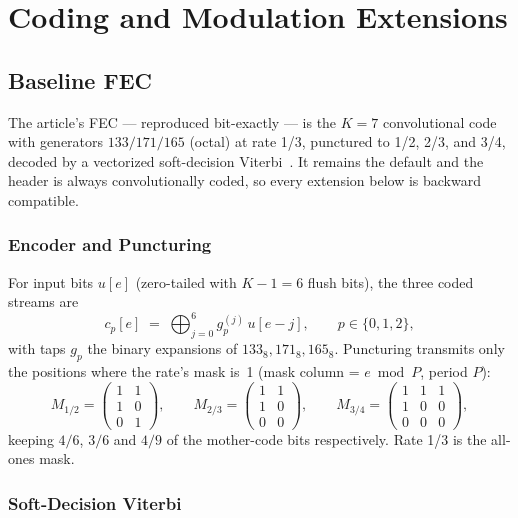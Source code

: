 \section{Coding and Modulation Extensions}
\label{sec:coding}

\subsection{Baseline FEC}

The article's FEC --- reproduced bit-exactly --- is the $K=7$
convolutional code with generators $133/171/165$ (octal) at rate 1/3,
punctured to 1/2, 2/3, and 3/4, decoded by a vectorized soft-decision
Viterbi~\cite{viterbi1967}.  It remains the default and the header is
always convolutionally coded, so every extension below is backward
compatible.

\subsubsection{Encoder and Puncturing}

For input bits $u[e]$ (zero-tailed with $K-1 = 6$ flush bits), the
three coded streams are
\begin{equation}
    c_p[e] \;=\; \bigoplus_{j=0}^{6} g_p^{(j)}\, u[e-j],
    \qquad p \in \{0,1,2\},
\end{equation}
with taps $g_p$ the binary expansions of $133_8, 171_8, 165_8$.
Puncturing transmits only the positions where the rate's mask is~1
(mask column = $e \bmod P$, period $P$):
\begin{equation}
    \renewcommand{\arraystretch}{1.1}
    M_{1/2} = \begin{pmatrix} 1&1\\ 1&0\\ 0&1 \end{pmatrix},
    \qquad
    M_{2/3} = \begin{pmatrix} 1&1\\ 1&0\\ 0&0 \end{pmatrix},
    \qquad
    M_{3/4} = \begin{pmatrix} 1&1&1\\ 1&0&0\\ 0&0&0 \end{pmatrix},
\end{equation}
keeping $4/6$, $3/6$ and $4/9$ of the mother-code bits respectively.
Rate 1/3 is the all-ones mask.

\subsubsection{Soft-Decision Viterbi}

